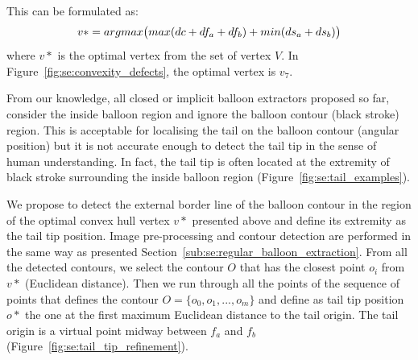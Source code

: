 This can be formulated as:
\begin{equation}\label{eq:se:optimisation}
   v* = argmax\big( max(dc+df_a+df_b) + min(ds_a + ds_b) \big)\\
 \end{equation}
 where $v*$ is the optimal vertex from the set of vertex $V$.
In Figure~\ref{fig:se:convexity_defects}, the optimal vertex is $v_7$.


From our knowledge, all closed or implicit balloon extractors proposed so far, consider the inside balloon region and ignore the balloon contour (black stroke) region.
This is acceptable for localising the tail on the balloon contour (angular position) but it is not accurate enough to detect the tail tip in the sense of human understanding.
In fact, the tail tip is often located at the extremity of black stroke surrounding the inside balloon region (Figure~\ref{fig:se:tail_examples}).



We propose to detect the external border line of the balloon contour in the region of the optimal convex hull vertex $v*$ presented above and define its extremity as the tail tip position.
Image pre-processing and contour detection are performed in the same way as presented Section~\ref{sub:se:regular_balloon_extraction}.
From all the detected contours, we select the contour $O$ that has the closest point $o_i$ from $v*$ (Euclidean distance).
Then we run through all the points of the sequence of points that defines the contour $O=\{o_0, o_1,...,o_m\}$ and define as tail tip position $o*$ the one at the first maximum Euclidean distance to the tail origin.
The tail origin is a virtual point midway between $f_a$ and $f_b$ (Figure~\ref{fig:se:tail_tip_refinement}).


